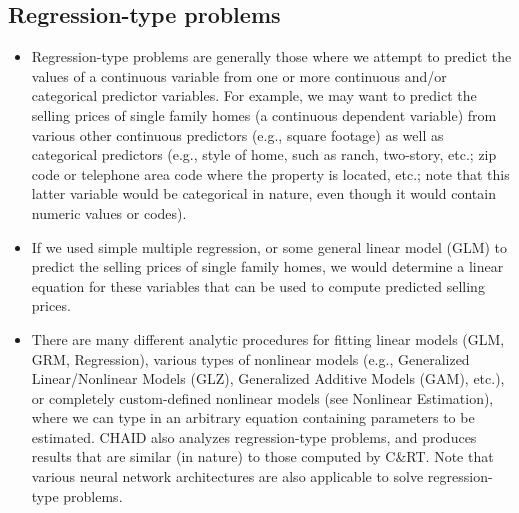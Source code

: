 \documentclass[caret-main.tex]{subfiles}
\begin{document}
\subsection{Regression-type problems} 
\begin{itemize}
\item Regression-type problems are generally those where we attempt to predict the values of a continuous variable from one or more continuous and/or categorical predictor variables. For example, we may want to predict the selling prices of single family homes (a continuous dependent variable) from various other continuous predictors (e.g., square footage) as well as categorical predictors (e.g., style of home, such as ranch, two-story, etc.; zip code or telephone area code where the property is located, etc.; note that this latter variable would be categorical in nature, even though it would contain numeric values or codes). 
\item If we used simple multiple regression, or some general linear model (GLM) to predict the selling prices of single family homes, we would determine a linear equation for these variables that can be used to compute predicted selling prices. 
\item There are many different analytic procedures for fitting linear models (GLM, GRM, Regression), various types of nonlinear models (e.g., Generalized Linear/Nonlinear Models (GLZ), Generalized Additive Models (GAM), etc.), or completely custom-defined nonlinear models (see Nonlinear Estimation), where we can type in an arbitrary equation containing parameters to be estimated. CHAID also analyzes regression-type problems, and produces results that are similar (in nature) to those computed by C\&RT. Note that various neural network architectures are also applicable to solve regression-type problems.
\end{itemize}

\newpage
\end{document}
